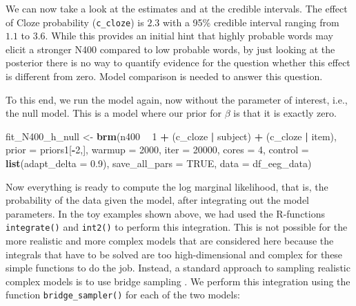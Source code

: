 \documentclass[12pt,]{krantz}
\newenvironment{Shaded}{\begin{snugshade}}{\end{snugshade}}
\newcommand{\KeywordTok}[1]{\textcolor[rgb]{0.13,0.29,0.53}{\textbf{#1}}}
\newcommand{\DataTypeTok}[1]{\textcolor[rgb]{0.13,0.29,0.53}{#1}}
\newcommand{\DecValTok}[1]{\textcolor[rgb]{0.00,0.00,0.81}{#1}}
\newcommand{\FloatTok}[1]{\textcolor[rgb]{0.00,0.00,0.81}{#1}}
\newcommand{\StringTok}[1]{\textcolor[rgb]{0.31,0.60,0.02}{#1}}
\newcommand{\OtherTok}[1]{\textcolor[rgb]{0.56,0.35,0.01}{#1}}
\newcommand{\OperatorTok}[1]{\textcolor[rgb]{0.81,0.36,0.00}{\textbf{#1}}}
\newcommand{\NormalTok}[1]{#1}
\theoremstyle{definition}
\theoremstyle{definition}
\theoremstyle{definition}
\theoremstyle{remark}
\begin{document}
We can now take a look at the estimates and at the credible intervals.
The effect of Cloze probability (\texttt{c\_cloze}) is \(2.3\) with a
95\% credible interval ranging from \(1.1\) to \(3.6\). While this
provides an initial hint that highly probable words may elicit a
stronger N400 compared to low probable words, by just looking at the
posterior there is no way to quantify evidence for the question whether
this effect is different from zero. Model comparison is needed to answer
this question.

To this end, we run the model again, now without the parameter of
interest, i.e., the null model. This is a model where our prior for
\(\beta\) is that it is exactly zero.

\begin{Shaded}
\begin{Highlighting}[]
\NormalTok{fit_N400_h_null <-}\StringTok{ }\KeywordTok{brm}\NormalTok{(n400 }\OperatorTok{~}\StringTok{ }\DecValTok{1} \OperatorTok{+}\StringTok{ }
\StringTok{    }\NormalTok{(c_cloze }\OperatorTok{|}\StringTok{ }\NormalTok{subject) }\OperatorTok{+}\StringTok{ }\NormalTok{(c_cloze }\OperatorTok{|}\StringTok{ }\NormalTok{item),}
    \DataTypeTok{prior   =}\NormalTok{ priors1[}\OperatorTok{-}\DecValTok{2}\NormalTok{,],}
    \DataTypeTok{warmup  =} \DecValTok{2000}\NormalTok{,}
    \DataTypeTok{iter    =} \DecValTok{20000}\NormalTok{,}
    \DataTypeTok{cores   =} \DecValTok{4}\NormalTok{,}
    \DataTypeTok{control =} \KeywordTok{list}\NormalTok{(}\DataTypeTok{adapt_delta =} \FloatTok{0.9}\NormalTok{),}
    \DataTypeTok{save_all_pars =} \OtherTok{TRUE}\NormalTok{,}
    \DataTypeTok{data    =}\NormalTok{ df_eeg_data)}
\end{Highlighting}
\end{Shaded}

Now everything is ready to compute the log marginal likelihood, that is,
the probability of the data given the model, after integrating out the
model parameters. In the toy examples shown above, we had used the
R-functions \texttt{integrate()} and \texttt{int2()} to perform this
integration. This is not possible for the more realistic and more
complex models that are considered here because the integrals that have
to be solved are too high-dimensional and complex for these simple
functions to do the job. Instead, a standard approach to sampling
realistic complex models is to use bridge sampling
\citep{gronauTutorialBridgeSampling2017, gronauBridgesamplingPackageEstimating2017}.
We perform this integration using the function
\texttt{bridge\_sampler()} for each of the two models:
\end{document}
